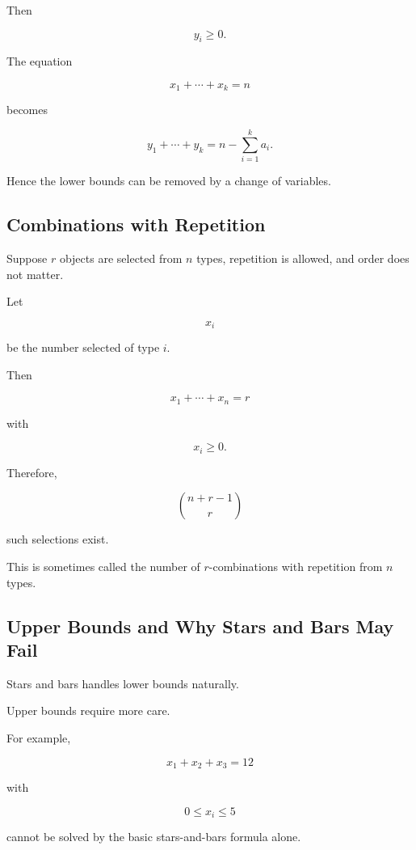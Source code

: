 Then

\[
y_i\geq0.
\]

The equation

\[
x_1+\cdots+x_k=n
\]

becomes

\[
y_1+\cdots+y_k
=
n-\sum_{i=1}^{k}a_i.
\]

Hence the lower bounds can be removed by a change of variables.

\subsection{Combinations with Repetition}
\label{subsec:combinations-with-repetition}

Suppose \(r\) objects are selected from \(n\) types, repetition is
allowed, and order does not matter.

Let

\[
x_i
\]

be the number selected of type \(i\).

Then

\[
x_1+\cdots+x_n=r
\]

with

\[
x_i\geq0.
\]

Therefore,

\[
\boxed{
\binom{n+r-1}{r}
}
\]

such selections exist.

This is sometimes called the number of \(r\)-combinations with
repetition from \(n\) types.

\subsection{Upper Bounds and Why Stars and Bars May Fail}
\label{subsec:stars-bars-upper-bounds}

Stars and bars handles lower bounds naturally.

Upper bounds require more care.

For example,

\[
x_1+x_2+x_3=12
\]

with

\[
0\leq x_i\leq5
\]

cannot be solved by the basic stars-and-bars formula alone.

